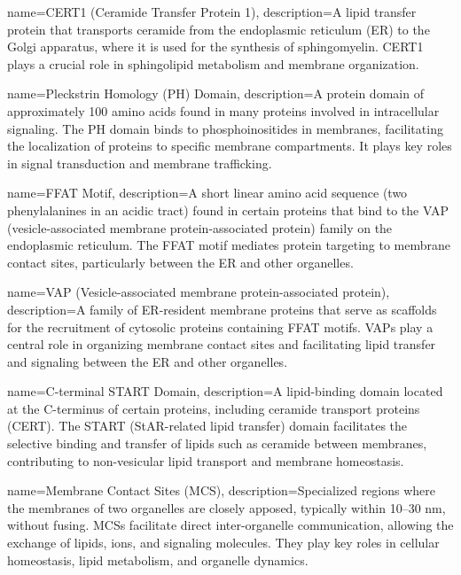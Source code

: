 {
    name={CERT1 (Ceramide Transfer Protein 1)},
    description={A lipid transfer protein that transports ceramide from the endoplasmic reticulum (ER) to the Golgi apparatus, where it is used for the synthesis of sphingomyelin. CERT1 plays a crucial role in sphingolipid metabolism and membrane organization. }
}

{
    name={Pleckstrin Homology (PH) Domain},
    description={A protein domain of approximately 100 amino acids found in many proteins involved in intracellular signaling. The PH domain binds to phosphoinositides in membranes, facilitating the localization of proteins to specific membrane compartments. It plays key roles in signal transduction and membrane trafficking.}
}

{
    name={FFAT Motif},
    description={A short linear amino acid sequence (two phenylalanines in an acidic tract) found in certain proteins that bind to the VAP (vesicle-associated membrane protein-associated protein) family on the endoplasmic reticulum. The FFAT motif mediates protein targeting to membrane contact sites, particularly between the ER and other organelles.}
}

{
    name={VAP (Vesicle-associated membrane protein-associated protein)},
    description={A family of ER-resident membrane proteins that serve as scaffolds for the recruitment of cytosolic proteins containing FFAT motifs. VAPs play a central role in organizing membrane contact sites and facilitating lipid transfer and signaling between the ER and other organelles.}
}

{
    name={C-terminal START Domain},
    description={A lipid-binding domain located at the C-terminus of certain proteins, including ceramide transport proteins (CERT). The START (StAR-related lipid transfer) domain facilitates the selective binding and transfer of lipids such as ceramide between membranes, contributing to non-vesicular lipid transport and membrane homeostasis.}
}

{
    name={Membrane Contact Sites (MCS)},
    description={Specialized regions where the membranes of two organelles are closely apposed, typically within 10–30 nm, without fusing. MCSs facilitate direct inter-organelle communication, allowing the exchange of lipids, ions, and signaling molecules. They play key roles in cellular homeostasis, lipid metabolism, and organelle dynamics.}
}

